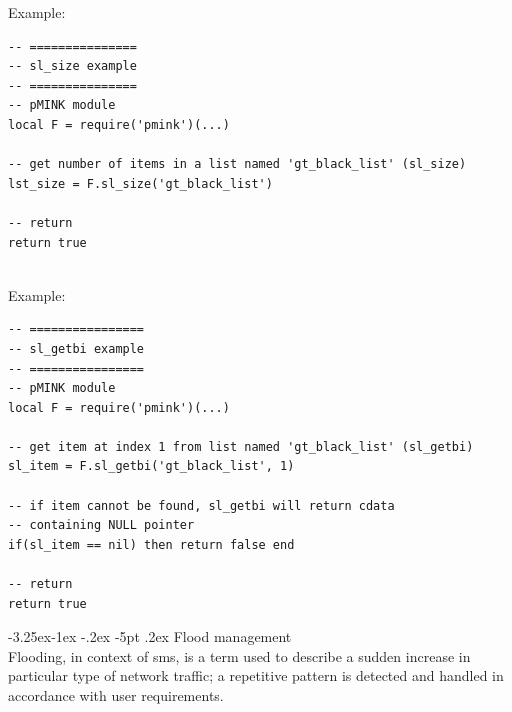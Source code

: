 \documentclass[a4paper,latin]{paper}
\makeatletter
\renewcommand\subparagraph{\@startsection{subparagraph}{5}{\z@}%
                                     {-3.25ex\@plus -1ex \@minus -.2ex}%
                                     {-5pt \@plus .2ex}%
                                     {\normalfont\normalsize\bfseries}}
\makeatother
\begin{document}
\noindent{}Example:
\begin{lstlisting}[style=LuaInputStyle, belowskip=4\baselineskip, upquote=true]
-- ===============
-- sl_size example 
-- ===============
-- pMINK module
local F = require('pmink')(...)

-- get number of items in a list named 'gt_black_list' (sl_size)
lst_size = F.sl_size('gt_black_list')

-- return
return true
\end{lstlisting}

\\

\noindent{}Example:
\begin{lstlisting}[style=LuaInputStyle, belowskip=\baselineskip, upquote=true]
-- ================
-- sl_getbi example 
-- ================
-- pMINK module
local F = require('pmink')(...)

-- get item at index 1 from list named 'gt_black_list' (sl_getbi)
sl_item = F.sl_getbi('gt_black_list', 1)

-- if item cannot be found, sl_getbi will return cdata 
-- containing NULL pointer
if(sl_item == nil) then return false end

-- return
return true
\end{lstlisting}
\clearpage

\subparagraph{Flood management}\label{SECTION_FLOOD}
\mbox{}\\
Flooding, in context of \acrfull{sms}, is a term used to describe a sudden increase in particular type of network traffic; a repetitive pattern
is detected and handled in accordance with user requirements.\\
\end{document}
